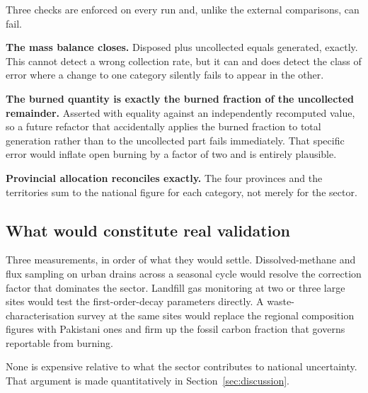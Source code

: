 Three checks are enforced on every run and, unlike the external comparisons, can fail.

\textbf{The mass balance closes.} Disposed plus uncollected equals generated, exactly.
This cannot detect a wrong collection rate, but it can and does detect the class of error
where a change to one category silently fails to appear in the other.

\textbf{The burned quantity is exactly the burned fraction of the uncollected remainder.}
Asserted with equality against an independently recomputed value, so a future refactor that
accidentally applies the burned fraction to total generation rather than to the uncollected
part fails immediately. That specific error would inflate open burning by a factor of two and
is entirely plausible.

\textbf{Provincial allocation reconciles exactly.} The four provinces and the territories sum
to the national figure for each category, not merely for the sector.

\subsection{What would constitute real validation}

Three measurements, in order of what they would settle. Dissolved-methane and flux sampling on
urban drains across a seasonal cycle would resolve the correction factor that dominates the
sector. Landfill gas monitoring at two or three large sites would test the first-order-decay
parameters directly. A waste-characterisation survey at the same sites would replace the
regional composition figures with Pakistani ones and firm up the fossil carbon fraction that
governs reportable \COtwo{} from burning.

None is expensive relative to what the sector contributes to national uncertainty. That
argument is made quantitatively in Section~\ref{sec:discussion}.
